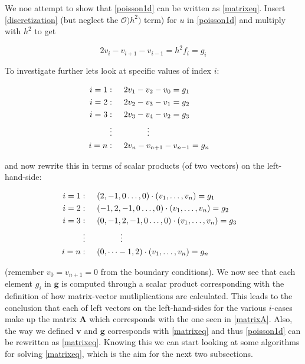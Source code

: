 \documentclass[12pt]{article}
\numberwithin{figure}{section}
\numberwithin{table}{section}
\begin{document}
\noindent We noe attempt to show that \eqref{poisson1d} can be written as \eqref{matrixeq}. Insert \eqref{discretization} (but neglect the $\mathcal{O})h^2)$ term) for $u$ in \eqref{poisson1d} and multiply with $h^2$ to get

\begin{equation}
	\label{General}
 2v_i - v_{i+1} - v_{i-1} = h^2 f_i = g_i
\end{equation}

\noindent To investigate further lets look at specific values of index $i$:

\begin{align*}
i=1: & \hspace{0.5cm} 2v_1 - v_{2} - v_{0} = g_1 & 					\\
i=2: &	\hspace{0.5cm} 2v_2 - v_{3} - v_{1} = g_2 & 					\\
i=3: &	\hspace{0.5cm} 2v_3 - v_{4} - v_{2} = g_3 & 					\\
\vdots & \hspace{1.5cm} \vdots	&			\\
i=n: & \hspace{0.5cm} 2v_n - v_{n+1} - v_{n-1} = g_n & 
\end{align*}

\noindent and now rewrite this in terms of scalar products (of two vectors) on the left-hand-side:

\begin{align*}
i=1: & \hspace{0.5cm} (2, -1, 0 \dots ,0)\cdot(v_1, \dots , v_n) = g_1 & 					\\
i=2: & \hspace{0.5cm} (-1, 2, -1, 0 \dots ,0)\cdot(v_1, \dots , v_n) = g_2 & 					\\
i=3: & \hspace{0.5cm} (0, -1, 2, -1, 0 \dots ,0)\cdot(v_1, \dots , v_n) = g_3 & 					\\
\vdots &	\hspace{1.5cm}		\vdots																\\
i=n: & \hspace{0.5cm} (0, \dots -1, 2)\cdot(v_1, \dots , v_n) = g_n & 					\\
\end{align*}

\noindent (remember $v_0=v_{n+1}=0$ from the boundary conditions). We now see that each element $g_i$ in $\mathbf{g}$ is computed through a scalar product corresponding with the definition of how matrix-vector mutliplications are calculated. This leads to the conclusion that each of left vectors on the left-hand-sides for the various $i$-cases make up the matrix $\mathbf{A}$ which corresponds with the one seen in \eqref{matrixA}. Also, the way we defined $\mathbf{v}$ and $\mathbf{g}$ corresponds with \eqref{matrixeq} and thus \eqref{poisson1d} can be rewritten as \eqref{matrixeq}. Knowing this we can start looking at some algorithms for solving \eqref{matrixeq}, which is the aim for the next two subsections.
\end{document}
